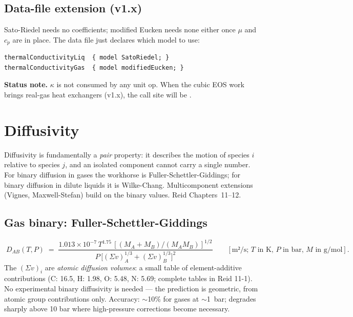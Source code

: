 \documentclass[11pt,a4paper]{article}
\begin{document}
\subsection{Data-file extension (v1.x)}

Sato-Riedel needs no coefficients; modified Eucken needs none either
once $\mu$ and $c_p$ are in place.  The data file just declares
which model to use:
\begin{lstlisting}
thermalConductivityLiq  { model SatoRiedel; }
thermalConductivityGas  { model modifiedEucken; }
\end{lstlisting}

\begin{tutoriallink}
\textbf{Status note.}  $\kappa$ is not consumed by any unit
op.  When the cubic EOS work brings real-gas heat exchangers
(v1.x), the call site will be .
\end{tutoriallink}

\section{Diffusivity}\label{ch:diffusivity}

\begin{whatyoulllearn}
Diffusivity is fundamentally a \emph{pair} property: it describes
the motion of species $i$ relative to species $j$, and an isolated
component cannot carry a single number.  For binary diffusion in
gases the workhorse is Fuller-Schettler-Giddings; for binary
diffusion in dilute liquids it is Wilke-Chang.  Multicomponent
extensions (Vignes, Maxwell-Stefan) build on the binary values.
Reid Chapters~11--12.
\end{whatyoulllearn}

\subsection{Gas binary: Fuller-Schettler-Giddings}

\begin{equation}
   \boxed{\;
   D_{AB}(T, P) \;=\;
     \frac{1.013 \times 10^{-7}\,T^{1.75}\,[(M_A + M_B)/(M_A M_B)]^{1/2}}
          {P\,\bigl[(\Sigma v)_A^{1/3} + (\Sigma v)_B^{1/3}\bigr]^2}
     \qquad [\text{m²/s; $T$ in K, $P$ in bar, $M$ in g/mol}].
   \;}
   \label{eq:fuller}
\end{equation}
The $(\Sigma v)_i$ are \emph{atomic diffusion volumes}: a small
table of element-additive contributions (C: 16.5, H: 1.98, O: 5.48,
N: 5.69; complete tables in Reid 11-1).  No experimental binary
diffusivity is needed --- the prediction is geometric, from atomic
group contributions only.  Accuracy: $\sim$10\% for gases at
$\sim$1~bar; degrades sharply above 10 bar where high-pressure
corrections become necessary.
\end{document}
